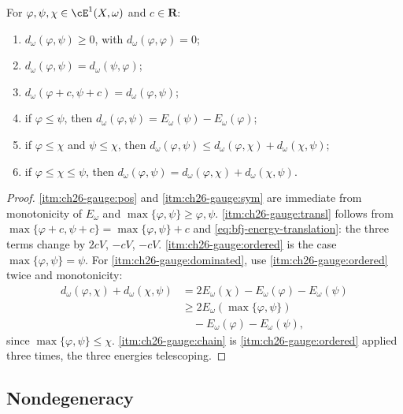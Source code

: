 \begin{proposition}
\label{prop:ch26-gauge-elementary}
For \(\varphi,\psi,\chi\in\cE^1(X,\omega)\) and \(c\in\mathbf R\):
\begin{enumerate}
\item\label{itm:ch26-gauge:pos}
 \(d_\omega(\varphi,\psi)\geq0\), with \(d_\omega(\varphi,\varphi)=0\);
\item\label{itm:ch26-gauge:sym}
 \(d_\omega(\varphi,\psi)=d_\omega(\psi,\varphi)\);
\item\label{itm:ch26-gauge:transl}
 \(d_\omega(\varphi+c,\psi+c)=d_\omega(\varphi,\psi)\);
\item\label{itm:ch26-gauge:ordered}
 if \(\varphi\leq\psi\), then
 \(d_\omega(\varphi,\psi)=E_\omega(\psi)-E_\omega(\varphi)\);
\item\label{itm:ch26-gauge:dominated}
 if \(\varphi\leq\chi\) and \(\psi\leq\chi\), then
 \(d_\omega(\varphi,\psi)\leq d_\omega(\varphi,\chi)+d_\omega(\chi,\psi)\);
\item\label{itm:ch26-gauge:chain}
 if \(\varphi\leq\chi\leq\psi\), then
 \(d_\omega(\varphi,\psi)=d_\omega(\varphi,\chi)+d_\omega(\chi,\psi)\).
\end{enumerate}
\end{proposition}

\begin{proof}
\cref{itm:ch26-gauge:pos} and \cref{itm:ch26-gauge:sym} are immediate from
monotonicity of \(E_\omega\) and \(\max\{\varphi,\psi\}\geq\varphi,\psi\).
\cref{itm:ch26-gauge:transl} follows from
\(\max\{\varphi+c,\psi+c\}=\max\{\varphi,\psi\}+c\) and
\eqref{eq:bfj-energy-translation}: the three terms change by \(2cV\),
\(-cV\), \(-cV\).  \cref{itm:ch26-gauge:ordered} is the case
\(\max\{\varphi,\psi\}=\psi\).  For \cref{itm:ch26-gauge:dominated}, use
\cref{itm:ch26-gauge:ordered} twice and monotonicity:
\[
 \begin{aligned}
 d_\omega(\varphi,\chi)+d_\omega(\chi,\psi)
 &=2E_\omega(\chi)-E_\omega(\varphi)-E_\omega(\psi)\\
 &\geq 2E_\omega(\max\{\varphi,\psi\})\\
 &\quad-E_\omega(\varphi)-E_\omega(\psi),
 \end{aligned}
\]
since \(\max\{\varphi,\psi\}\leq\chi\).  \cref{itm:ch26-gauge:chain} is
\cref{itm:ch26-gauge:ordered} applied three times, the three energies
telescoping.
\end{proof}

\subsection{Nondegeneracy}
\label{sec:ch26-gauge-nondegenerate}

